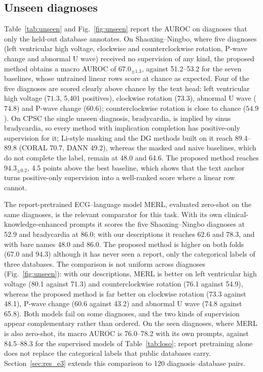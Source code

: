 
\subsection{Unseen diagnoses}\label{sec:res_unseen}
Table~\ref{tab:unseen} and Fig.~\ref{fig:unseen} report the AUROC on diagnoses that only the held-out database annotates. On Shaoxing--Ningbo, where five diagnoses (left ventricular high voltage, clockwise and counterclockwise rotation, P-wave change and abnormal U wave) received no supervision of any kind, the proposed method obtains a macro AUROC of $67.0_{\pm1.3}$, against 51.2--53.2 for the seven baselines, whose untrained linear rows score at chance as expected. Four of the five diagnoses are scored clearly above chance by the text head: left ventricular high voltage ($71.3$, 5{,}401 positives), clockwise rotation ($73.3$), abnormal U wave ($74.8$) and P-wave change ($60.6$); counterclockwise rotation is close to chance ($54.9$). On CPSC the single unseen diagnosis, bradycardia, is implied by sinus bradycardia, so every method with implication completion has positive-only supervision for it; Li-style masking and the DG methods built on it reach 89.4--89.8 (CORAL 70.7, DANN 49.2), whereas the masked and naive baselines, which do not complete the label, remain at 48.0 and 64.6. The proposed method reaches $94.3_{\pm0.2}$, 4.5 points above the best baseline, which shows that the text anchor turns positive-only supervision into a well-ranked score where a linear row cannot.

The report-pretrained ECG--language model MERL, evaluated zero-shot on the same diagnoses, is the relevant comparator for this task. With its own clinical-knowledge-enhanced prompts it scores the five Shaoxing--Ningbo diagnoses at 52.9 and bradycardia at 86.0; with our descriptions it reaches 62.6 and 78.3, and with bare names 48.0 and 86.0. The proposed method is higher on both folds (67.0 and 94.3) although it has never seen a report, only the categorical labels of three databases. The comparison is not uniform across diagnoses (Fig.~\ref{fig:unseen}): with our descriptions, MERL is better on left ventricular high voltage (80.1 against 71.3) and counterclockwise rotation (76.1 against 54.9), whereas the proposed method is far better on clockwise rotation (73.3 against 48.1), P-wave change (60.6 against 43.2) and abnormal U wave (74.8 against 65.8). Both models fail on some diagnoses, and the two kinds of supervision appear complementary rather than ordered. On the seen diagnoses, where MERL is also zero-shot, its macro AUROC is 76.0--78.2 with its own prompts, against 84.5--88.3 for the supervised models of Table~\ref{tab:loso}; report pretraining alone does not replace the categorical labels that public databases carry. Section~\ref{sec:res_e3} extends this comparison to 120 diagnosis--database pairs.

